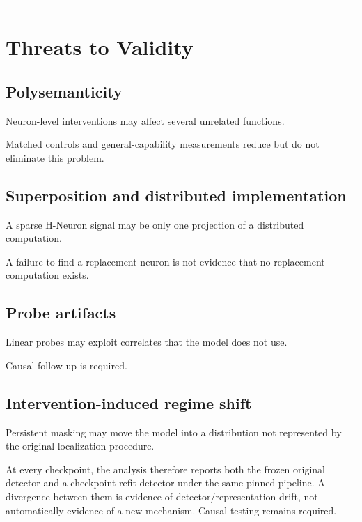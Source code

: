 \begin{center}\rule{0.5\linewidth}{0.5pt}\end{center}

\section{Threats to Validity}\label{threats-to-validity}

\subsection{Polysemanticity}\label{polysemanticity}

Neuron-level interventions may affect several unrelated functions.

Matched controls and general-capability measurements reduce but do not eliminate this problem.

\subsection{Superposition and distributed implementation}\label{superposition-and-distributed-implementation}

A sparse H-Neuron signal may be only one projection of a distributed computation.

A failure to find a replacement neuron is not evidence that no replacement computation exists.

\subsection{Probe artifacts}\label{probe-artifacts}

Linear probes may exploit correlates that the model does not use.

Causal follow-up is required.

\subsection{Intervention-induced regime shift}\label{intervention-induced-regime-shift}

Persistent masking may move the model into a distribution not represented by the original localization procedure.

At every checkpoint, the analysis therefore reports both the frozen original detector and a checkpoint-refit detector under the same pinned pipeline. A divergence between them is evidence of detector/representation drift, not automatically evidence of a new mechanism. Causal testing remains required.

